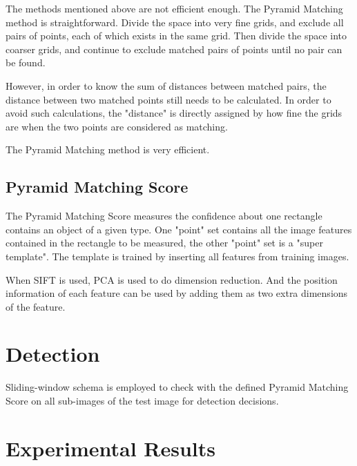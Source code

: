 The methods mentioned above are not efficient enough. The Pyramid Matching method is straightforward. Divide the space into very fine grids, and exclude all pairs of points, each of which exists in the same grid. Then divide the space into coarser grids, and continue to exclude matched pairs of points until no pair can be found.

However, in order to know the sum of distances between matched pairs, the distance between two matched points still needs to be calculated. In order to avoid such calculations, the "distance" is directly assigned by how fine the grids are when the two points are considered as matching.

The Pyramid Matching method is very efficient.

\subsection{Pyramid Matching Score}

The Pyramid Matching Score measures the confidence about one rectangle contains an object of a given type. One "point" set contains all the image features contained in the rectangle to be measured, the other "point" set is a "super template". The template is trained by inserting all features from training images.

When SIFT is used, PCA is used to do dimension reduction. And the position information of each feature can be used by adding them as two extra dimensions of the feature.

\section{Detection}
\label{dt5}

Sliding-window schema is employed to check with the defined Pyramid Matching Score on all sub-images of the test image for detection decisions.

\section{Experimental Results}
\label{exp5}


